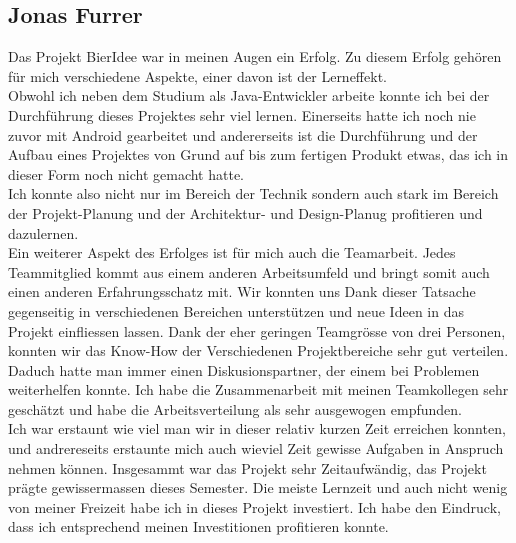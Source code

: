 \documentclass[10pt,a4paper]{scrartcl}
\begin{document}
\newpage
\subsection{Jonas Furrer}
Das Projekt BierIdee war in meinen Augen ein Erfolg. Zu diesem Erfolg gehören für mich verschiedene Aspekte, einer davon 
ist der Lerneffekt.\\
Obwohl ich neben dem Studium als Java-Entwickler arbeite konnte ich bei der Durchführung dieses Projektes sehr viel 
lernen. Einerseits hatte ich noch nie zuvor mit Android gearbeitet und andererseits ist die Durchführung und der Aufbau
eines Projektes von Grund auf bis zum fertigen Produkt etwas, das ich in dieser Form noch nicht gemacht hatte.\\
Ich konnte also nicht nur im Bereich der Technik sondern auch stark im Bereich der Projekt-Planung und der 
Architektur- und Design-Planug profitieren und dazulernen.\\
Ein weiterer Aspekt des Erfolges ist für mich auch die Teamarbeit. Jedes Teammitglied kommt aus einem anderen 
Arbeitsumfeld und bringt somit auch einen anderen Erfahrungsschatz mit. Wir konnten uns Dank dieser Tatsache gegenseitig
in verschiedenen Bereichen unterstützen und neue Ideen in das Projekt einfliessen lassen. Dank der eher geringen
Teamgrösse von drei Personen, konnten wir das Know-How der Verschiedenen Projektbereiche sehr gut verteilen. Daduch
hatte man immer einen Diskusionspartner, der einem bei Problemen weiterhelfen konnte. Ich habe die Zusammenarbeit mit 
meinen Teamkollegen sehr geschätzt und habe die Arbeitsverteilung als sehr ausgewogen empfunden.\\
Ich war erstaunt wie viel man wir in dieser relativ kurzen Zeit erreichen konnten, und andrereseits erstaunte mich auch
wieviel Zeit gewisse Aufgaben in Anspruch nehmen können. Insgesammt war das Projekt sehr Zeitaufwändig, das Projekt
prägte gewissermassen dieses Semester. Die meiste Lernzeit und auch nicht wenig von meiner Freizeit habe ich in dieses
Projekt investiert. Ich habe den Eindruck, dass ich entsprechend meinen Investitionen profitieren konnte.
\end{document}
